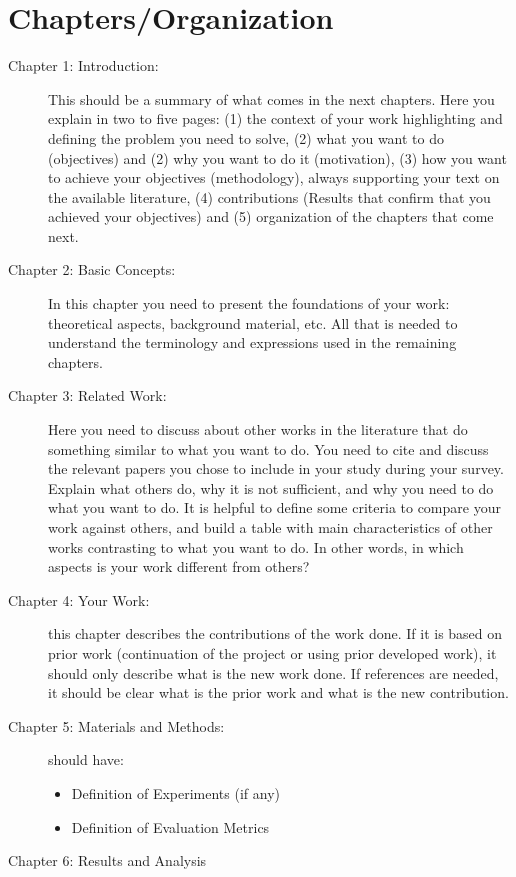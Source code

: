 \section{Chapters/Organization}
\begin{description}
   \item[Chapter 1: Introduction:]
This should be a summary of what comes in the next chapters. Here you explain in two to five
pages: (1) the context of your work highlighting and defining the problem you need to solve, (2)
what you want to do (objectives) and (2) why you want to do it (motivation), (3) how you want to
achieve your objectives (methodology), always supporting your text on the available literature, (4)
contributions (Results that confirm that you achieved your objectives) and (5) organization of the
chapters that come next.
\item[Chapter 2: Basic Concepts:]
In this chapter you need to present the foundations of your work: theoretical aspects, background
material, etc. All that is needed to understand the terminology and expressions used in the remaining
chapters.
\item[Chapter 3: Related Work:]
Here you need to discuss about other works in the literature that do something similar to what
you want to do. You need to cite and discuss the relevant papers you chose to include in your study
during your survey. Explain what others do, why it is not sufficient, and why you need to do what
you want to do. It is helpful to define some criteria to compare your work against others, and
build a table with main characteristics of other works contrasting to what you want to do. In other
words, in which aspects is your work different from others?
\item[Chapter 4: Your Work:] this chapter describes the contributions of the work done. If it is based on prior work (continuation of the project or using prior developed work), it should only describe what is the new work done. If references are needed, it should be clear what is the prior work and what is the new contribution.
\item[Chapter 5: Materials and Methods:] should have:
   \begin{itemize}
      \item Definition of Experiments (if any)
      \item Definition of Evaluation Metrics
   \end{itemize}
\item[Chapter 6: Results and Analysis]

\end{description}
